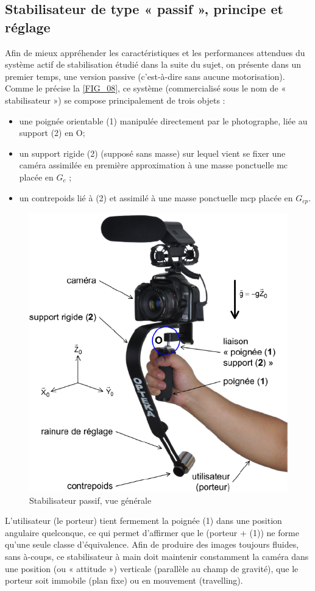 \documentclass[10pt,fleqn]{article} %
\begin{document}
\subsection{Stabilisateur de type « passif », principe et réglage}
 

Afin de mieux appréhender les caractéristiques et les performances attendues du système actif de stabilisation étudié dans la suite du sujet, on présente dans un premier temps, une version passive (c’est-à-dire sans aucune motorisation). Comme le précise la \autoref{FIG_08}, ce système (commercialisé sous le nom de « stabilisateur ») se compose principalement de trois objets :
\begin{itemize}
\item une poignée orientable (1) manipulée directement par le photographe, liée au support (2) en O;
\item un support rigide (2) (supposé sans masse) sur lequel vient se fixer une caméra assimilée en première approximation à une masse ponctuelle mc placée en $G_c$ ;
\item un contrepoids lié à (2) et assimilé à une masse ponctuelle mcp placée en $G_{cp}$.
\end{itemize}

\begin{figure}[H]
\centering
\includegraphics[width=.5\linewidth]{FiG_08}
\caption{Stabilisateur passif, vue générale\label{FIG_08}}
\end{figure}

L’utilisateur (le porteur) tient fermement la poignée (1) dans une position angulaire quelconque, ce qui permet d’affirmer que le (porteur + (1)) ne forme qu’une seule classe d’équivalence. 
Afin de produire des images toujours fluides, sans à-coups, ce stabilisateur à main doit maintenir constamment la caméra dans une position (ou « attitude ») verticale (parallèle au champ de gravité), que le porteur soit immobile (plan fixe) ou en mouvement (travelling).
\end{document}
